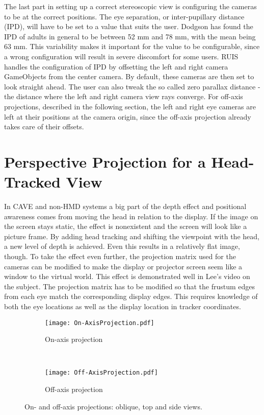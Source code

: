 \documentclass[12pt,a4paper,oneside,pdftex]{report}
\begin{document}
The last part in setting up a correct stereoscopic view is configuring the cameras to be at the correct positions. The eye separation, or inter-pupillary distance (IPD), will have to be set to a value that suits the user. Dodgson  \cite{Dodgson04variationand} has found the IPD of adults in general to be between 52 mm and 78 mm, with the mean being 63 mm. This variability makes it important for the value to be configurable, since a wrong configuration will result in severe discomfort for some users. RUIS handles the configuration of IPD by offsetting the left and right camera GameObjects from the center camera. By default, these cameras are then set to look straight ahead. The user can also tweak the so called zero parallax distance - the distance where the left and right camera view rays converge. For off-axis projections, described in the following section, the left and right eye cameras are left at their positions at the camera origin, since the off-axis projection already takes care of their offsets.

\section{Perspective Projection for a Head-Tracked View}
\label{section:perspectiveprojection}

In CAVE and non-HMD systems a big part of the depth effect and positional awareness comes from moving the head in relation to the display. If the image on the screen stays static, the effect is nonexistent and the screen will look like a picture frame. By adding head tracking and shifting the viewpoint with the head, a new level of depth is achieved. Even this results in a relatively flat image, though. To take the effect even further, the projection matrix used for the cameras can be modified to make the display or projector screen seem like a window to the virtual world. This effect is demonstrated well in Lee's \cite{JohnnyLeePerspective} video on the subject. The projection matrix has to be modified so that the frustum edges from each eye match the corresponding display edges. This requires knowledge of both the eye locations as well as the display location in tracker coordinates.

\begin{figure}[h]
    \centering
    \captionsetup{justification=centering}
    \begin{subfigure}{\textwidth}
        \texttt{[image: On-AxisProjection.pdf]}
        \caption{On-axis projection}
        \label{subfig:keystoneOriginal}
    \end{subfigure}
    \\[1em]
    \begin{subfigure}{\textwidth}
        \texttt{[image: Off-AxisProjection.pdf]}
        \caption{Off-axis projection}
        \label{subfig:keystoneHorizontal}
    \end{subfigure}
    \caption{On- and off-axis projections: oblique, top and side views.} \label{fig:frustumSkewing}
\end{figure}
\end{document}
